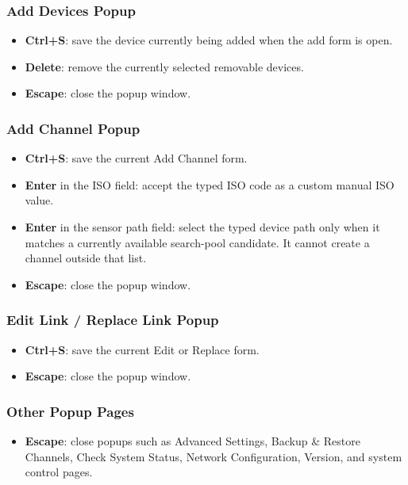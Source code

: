 \documentclass[11pt,a4paper]{article}
\begin{document}
\subsubsection{Add Devices Popup}
\begin{itemize}
\item \textbf{Ctrl+S}: save the device currently being added when the add form is open.
\item \textbf{Delete}: remove the currently selected removable devices.
\item \textbf{Escape}: close the popup window.
\end{itemize}

\subsubsection{Add Channel Popup}
\begin{itemize}
\item \textbf{Ctrl+S}: save the current Add Channel form.
\item \textbf{Enter} in the ISO field: accept the typed ISO code as a custom manual ISO value.
\item \textbf{Enter} in the sensor path field: select the typed device path only when it matches a currently available search-pool candidate. It cannot create a channel outside that list.
\item \textbf{Escape}: close the popup window.
\end{itemize}

\subsubsection{Edit Link / Replace Link Popup}
\begin{itemize}
\item \textbf{Ctrl+S}: save the current Edit or Replace form.
\item \textbf{Escape}: close the popup window.
\end{itemize}

\subsubsection{Other Popup Pages}
\begin{itemize}
\item \textbf{Escape}: close popups such as Advanced Settings, Backup \& Restore Channels, Check System Status, Network Configuration, Version, and system control pages.
\end{itemize}
\end{document}
